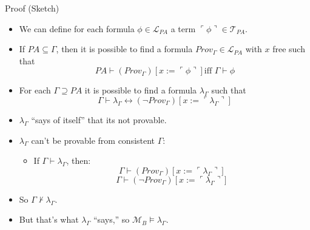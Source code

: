 \documentclass[../slides.tex]{subfiles}
\begin{document}
\begin{frame}{Proof (Sketch)}

  \begin{itemize}
  \item We can define for each formula $\phi\in\mathcal{L}_{PA}$ a
    term $\ulcorner \phi\urcorner\in\mathcal{T}_{PA}$.
  \item If $PA\subseteq \Gamma$, then it is possible to find a formula
    $Prov_\Gamma\in\mathcal{L}_{PA}$ with $x$ free  such
    that \[PA\vdash (Prov_\Gamma)[x:=\ulcorner \phi\urcorner]\text{
        iff }\Gamma\vdash\phi\]
   \item For each $\Gamma\supseteq PA$ it is possible to find a formula
     $\lambda_\Gamma$ such that
     \[\Gamma\vdash \lambda_\Gamma
       \leftrightarrow (\neg
       Prov_\Gamma)[x:=\ulcorner \lambda_\Gamma\urcorner]\]

   \item $\lambda_\Gamma$ ``says of itself'' that its not provable.

   \item $\lambda_\Gamma$ can't be provable from consistent $\Gamma$:

     \begin{itemize}
     \item If $\Gamma\vdash \lambda_\Gamma$, then: \[\Gamma\vdash
       (Prov_\Gamma)[x:=\ulcorner\lambda_\Gamma\urcorner]\]\[\Gamma\vdash
       (\neg Prov_\Gamma)[x:=\ulcorner\lambda_\Gamma\urcorner]\] 
   \end{itemize}

 \item So $\Gamma\nvdash \lambda_\Gamma$.

   \item But that's what $\lambda_\Gamma$ ``says,'' so
     $\mathcal{M}_B\vDash \lambda_\Gamma$.
  \end{itemize}
  
\end{frame}
\end{document}
